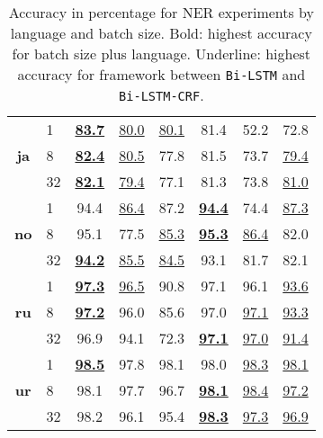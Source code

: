 \begin{table}[h!]
\begin{tabular}{c l c c c|c c c}
        \cmidrule(lr){1-8}
        \multirow{3}{*}{\bfseries ja}
        &  1 &
        \underline{\textbf{83.7}} & \underline{80.0} & \underline{80.1} &
        81.4 & 52.2 & 72.8 \\
        &  8 &
        \underline{\textbf{82.4}} & \underline{80.5} & 77.8 &
        81.5 & 73.7 & \underline{79.4} \\
        & 32 &
        \underline{\textbf{82.1}} & \underline{79.4} & 77.1 &
        81.3 & 73.8 & \underline{81.0} \\

        \cmidrule(lr){1-8}
        \multirow{3}{*}{\bfseries no}
        &  1 &
        94.4 & \underline{86.4} & 87.2 &
        \underline{\textbf{94.4}} & 74.4 & \underline{87.3} \\
        &  8 &
        95.1 & 77.5 & \underline{85.3} &
        \underline{\textbf{95.3}} & \underline{86.4} & 82.0 \\
        & 32 &
        \underline{\textbf{94.2}} & \underline{85.5} & \underline{84.5} &
        93.1 & 81.7 & 82.1 \\

        \cmidrule(lr){1-8}
        \multirow{3}{*}{\bfseries ru}
        &  1 &
        \underline{\textbf{97.3}} & \underline{96.5} & 90.8 &
        97.1 & 96.1 & \underline{93.6} \\
        &  8 &
        \underline{\textbf{97.2}} & 96.0 & 85.6 &
        97.0 & \underline{97.1} & \underline{93.3} \\
        & 32 &
        96.9 & 94.1 & 72.3 &
        \underline{\textbf{97.1}} & \underline{97.0} & \underline{91.4} \\

        \cmidrule(lr){1-8}
        \multirow{3}{*}{\bfseries ur}
        &  1 &
        \underline{\textbf{98.5}} & 97.8 & 98.1 &
        98.0 & \underline{98.3} & \underline{98.1} \\
        &  8 &
        98.1 & 97.7 & 96.7 &
        \underline{\textbf{98.1}} & \underline{98.4} & \underline{97.2} \\
        & 32 &
        98.2 & 96.1 & 95.4 &
        \underline{\textbf{98.3}} & \underline{97.3} & \underline{96.9} \\
        \bottomrule
    \end{tabular}
    \caption{Accuracy in percentage for NER experiments by language and batch
        size. Bold: highest accuracy for batch size plus language. Underline:
        highest accuracy for framework between \texttt{Bi-LSTM} and
        \texttt{Bi-LSTM-CRF}.
    }\label{table:acc-total-ner}
\end{table}



\pagebreak
